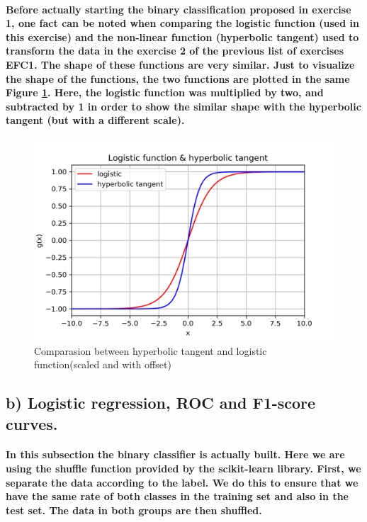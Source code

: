 \documentclass[a4paper]{article}    %
\begin{document}
\paragraph{Before actually starting the binary classification proposed in exercise 1, one fact can be noted when comparing the logistic function (used in this exercise) and the non-linear function (hyperbolic tangent) used to transform the data in the exercise 2 of the previous list of exercises EFC1. The shape of these functions are very similar. Just to visualize the shape of the functions, the two functions are plotted in the same Figure \ref{fig:pre-ex1-logistic_tanh}. Here, the logistic function was multiplied by two, and subtracted by 1 in order to show the similar shape with the hyperbolic tangent (but with a different scale).}

\begin{figure}[H]
    \centering
    \includegraphics[width=12cm]{logistic_vs_tanh}
    \caption{Comparasion between hyperbolic tangent and logistic function(scaled and with offset)}
    \label{fig:pre-ex1-logistic_tanh}
\end{figure}

\subsection{b) Logistic regression, ROC and F1-score curves.}

\paragraph{In this subsection the binary classifier is actually built. Here we are using the shuffle function provided by the scikit-learn library. First, we separate the data according to the label. We do this to ensure that we have the same rate of both classes in the training set and also in the test set. The data in both groups are then shuffled.}
\end{document}
